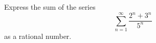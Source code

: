 \label{problemSum(2^n+3^n)/(5^n)}
Express the sum of the series 
\[
\sum\limits_{n=1}^{\infty} \frac{2^n+3^n}{5^n}
\]
as a rational number.

